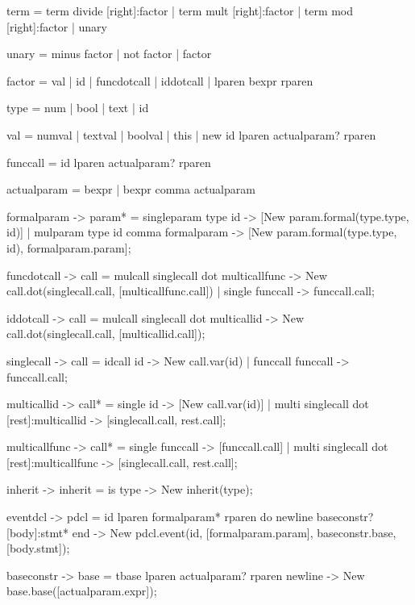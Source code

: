     term        =   term divide [right]:factor  
                |   term mult [right]:factor  
                |   term mod [right]:factor  
                |   unary               

    unary       =   minus factor 
                |   not factor
                |   factor  

    factor      =   val
                |   id
                |   funcdotcall
                |   iddotcall
                |   lparen bexpr rparen

    type        =   num  
                |   bool     
                |   text                        
                |   id   

    val         =   numval
                |   textval
                |   boolval
                |   this
                |   new id lparen actualparam? rparen

    funccall    =   id lparen actualparam? rparen


    actualparam =   bexpr
                |   bexpr comma actualparam

    formalparam {-> param*}  =   {singleparam} type id                                  {-> [New param.formal(type.type, id)]}
                            |   {mulparam} type id comma formalparam                    {-> [New param.formal(type.type, id), formalparam.param]};

    funcdotcall {-> call}   =   {mulcall} singlecall dot multicallfunc                  {-> New call.dot(singlecall.call, [multicallfunc.call])}
                            |   {single} funccall                                       {-> funccall.call};

    iddotcall {-> call}     =   {mulcall} singlecall dot multicallid                    {-> New call.dot(singlecall.call, [multicallid.call])};

    singlecall  {-> call}   =   {idcall} id                                             {-> New call.var(id)}
                            |   {funccall} funccall                                     {-> funccall.call};

    multicallid {-> call*}  =   {single} id                                             {-> [New call.var(id)]}
                            |   {multi} singlecall dot [rest]:multicallid                 {-> [singlecall.call, rest.call]};

    multicallfunc   {-> call*}  =   {single} funccall                                   {-> [funccall.call]}
                                |   {multi} singlecall dot [rest]:multicallfunc             {-> [singlecall.call, rest.call]};


    inherit     {-> inherit}    =    is type                                            {-> New inherit(type)};

    eventdcl    {-> pdcl}   =   id lparen formalparam* rparen do newline baseconstr? [body]:stmt* end          {-> New pdcl.event(id, [formalparam.param], baseconstr.base, [body.stmt])};

    baseconstr  {-> base}   =   tbase lparen actualparam? rparen newline                {-> New base.base([actualparam.expr])};